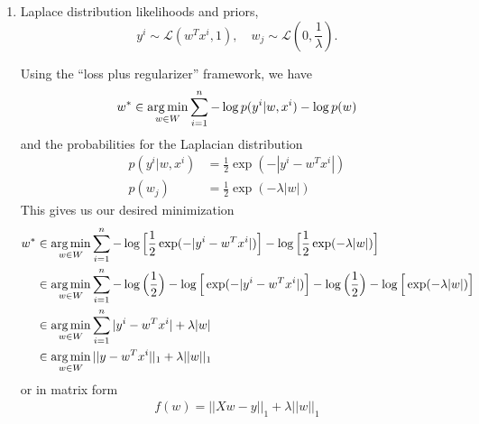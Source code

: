\begin{enumerate}
	\item Laplace distribution likelihoods and priors,
	$$y^i \sim \mathcal{L}(w^Tx^i,1), \quad w_j \sim \mathcal{L}\left(0,\frac{1}{\lambda}\right).$$
	
	Using the ``loss plus regularizer'' framework, we have
	\begin{align*}
		w^* \in \mathop{\rm arg\,min}_{w \in W} \sum_{i=1}^n -\log p(y^i | w, x^i) - \log p(w)
	\end{align*}
	and the probabilities for the Laplacian distribution
	\begin{align*}
		p(y^i | w, x^i) & = \frac{1}{2} \exp (- |y^i - w^Tx^i|) \\
		p(w_j) & = \frac{1}{2} \exp(-\lambda |w|)
	\end{align*}
	This gives us our desired minimization
	\begin{align*}
		w^* & \in \mathop{\rm arg\,min}_{w \in W} \sum_{i=1}^n -\log \Big[\frac{1}{2} \exp (- |y^i - w^Tx^i|) \Big] - \log \Big[\frac{1}{2} \exp(-\lambda |w|) \Big] \\
		& \in \mathop{\rm arg\,min}_{w \in W} \sum_{i=1}^n -\log \Big(\frac{1}{2} \Big) -\log \Big[\exp (- |y^i - w^Tx^i|) \Big] - \log \Big(\frac{1}{2}\Big) - \log \Big[\exp(-\lambda |w|) \Big]  \\
		& \in \mathop{\rm arg\,min}_{w \in W} \sum_{i=1}^n |y^i - w^Tx^i| + \lambda |w|  \\
		& \in \mathop{\rm arg\,min}_{w \in W} ||y- w^Tx^i||_{1} + \lambda ||w||_1
	\end{align*}
	or in matrix form
	\begin{align*}
		f(w) = ||Xw-y||_1 + \lambda ||w||_1
	\end{align*}
	

\end{enumerate}
